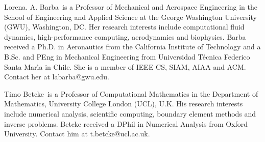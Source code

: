 \documentclass{IEEEcsmag}
\begin{document}
\begin{IEEEbiography}{Lorena. A. Barba}{\,} is a Professor of Mechanical and Aerospace Engineering in the School of Engineering and Applied Science at the George Washington University (GWU), Washington, DC. Her research interests include computational fluid dynamics, high-performance computing, aerodynamics and biophysics. Barba received a Ph.D. in Aeronautics from the California Institute of Technology and a B.Sc. and PEng in Mechanical Engineering from Universidad T\'ecnica Federico Santa Mar\`ia in Chile. She is a member of IEEE CS, SIAM, AIAA and ACM. Contact her at labarba@gwu.edu.
\end{IEEEbiography}

\begin{IEEEbiography}{Timo Betcke}{\,} is a Professor of Computational Mathematics in the Department of Mathematics, University College London (UCL), U.K. His research interests include numerical analysis, scientific computing, boundary element methods and inverse problems. Betcke received a DPhil in Numerical Analysis from Oxford University. Contact him at t.betcke@ucl.ac.uk.\end{IEEEbiography}
\end{document}
